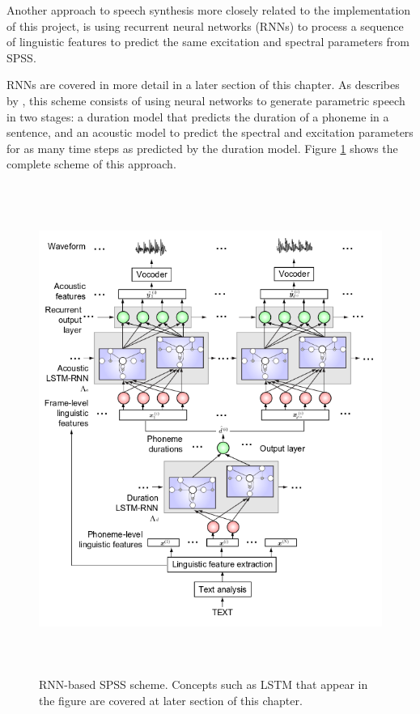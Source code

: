 Another approach to speech synthesis more closely related to the implementation of this project, is using recurrent neural networks (RNNs) to process a sequence of linguistic features to predict the same excitation and spectral parameters from SPSS.

RNNs are covered in more detail in a later section of this chapter. As describes by \cite{chen1998rnn}, this scheme consists of using neural networks to generate parametric speech in two stages: a duration model that predicts the duration of a phoneme in a sentence, and an acoustic model to predict the spectral and excitation parameters for as many time steps as predicted by the duration model. Figure \ref{fig:rnn-tts-0} shows the complete scheme of this approach.

\begin{figure}[h]
\centering
    \includegraphics[height=16cm]{figures/rnn-tts}
    \caption{RNN-based SPSS scheme. Concepts such as LSTM that appear in the figure are covered at later section of this chapter.}
    \label{fig:rnn-tts-0}
\end{figure}

